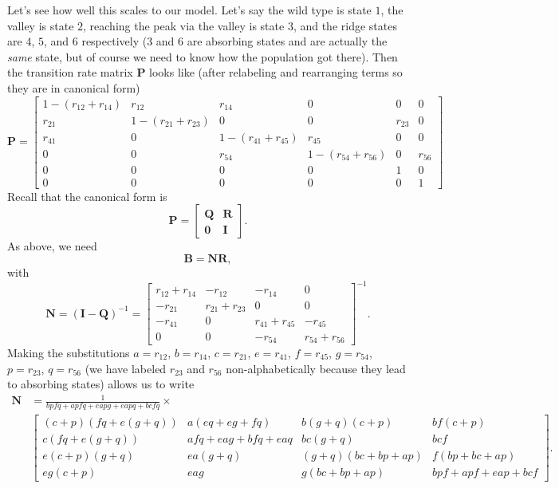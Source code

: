 \documentclass[11pt]{revtex4}
\begin{document}
Let's see how well this scales to our model.
Let's say the wild type is state $1$, the valley is state $2$, reaching the peak via the valley is state $3$, and the ridge states are $4$, $5$, and $6$ respectively ($3$ and $6$ are absorbing states and are actually the \emph{same} state, but of course we need to know how the population got there).
Then the transition rate matrix $\textbf{P}$ looks like (after relabeling and rearranging terms so they are in canonical form)
\begin{equation}
\textbf{P} =
\begin{bmatrix}
1-(r_{12} + r_{14}) & r_{12} & r_{14} & 0 & 0 & 0 \\
r_{21} & 1 - (r_{21} + r_{23}) & 0 & 0 & r_{23} & 0 \\
r_{41} & 0 & 1 - (r_{41} + r_{45}) & r_{45} & 0 & 0 \\
0 & 0 & r_{54} & 1 - (r_{54} + r_{56}) & 0 & r_{56} \\
0 & 0 & 0 & 0 & 1 & 0 \\
0 & 0 & 0 & 0 & 0 & 1

\end{bmatrix}
\end{equation}
Recall that the canonical form is
\begin{equation}
\textbf{P} =
\begin{bmatrix}
\textbf{Q} & \textbf{R} \\
\textbf{0} & \textbf{I}
\end{bmatrix}.
\end{equation}
As above, we need
\begin{equation}
\textbf{B} = \textbf{N}\textbf{R},
\end{equation}
with
\begin{equation}
\textbf{N} = (\textbf{I} - \textbf{Q})^{-1} =
\begin{bmatrix}
r_{12} + r_{14} & -r_{12} & -r_{14} & 0 \\
-r_{21} & r_{21} + r_{23} & 0 & 0 \\
-r_{41} & 0 & r_{41} + r_{45} & -r_{45} \\
0 & 0 & -r_{54} & r_{54} + r_{56}
\end{bmatrix}^{-1}.
\end{equation}
Making the substitutions
$a = r_{12}$,
$b = r_{14}$,
$c = r_{21}$,
$e = r_{41}$,
$f = r_{45}$,
$g = r_{54}$,
$p = r_{23}$,
$q = r_{56}$
(we have labeled $r_{23}$ and $r_{56}$ non-alphabetically because they lead to absorbing states) allows us to write
\begin{align}
\textbf{N} & = \frac{1}{bpfq + apfq + eapg + eapq + bcfq} \times \nonumber \\
& \begin{bmatrix}
(c+p)(fq+e(g+q)) & a(eq + eg + fq) & b(g+q)(c+p) & bf(c+p) \\
c(fq + e(g+q)) & afq+eag+bfq+eaq & bc(g+q) & bcf \\
e(c+p)(g+q) & ea(g+q) & (g+q)(bc+bp+ap) & f(bp+bc+ap) \\
eg(c+p) & eag & g(bc+bp+ap) & bpf + apf + eap + bcf
\end{bmatrix}.
\end{align}
\end{document}
